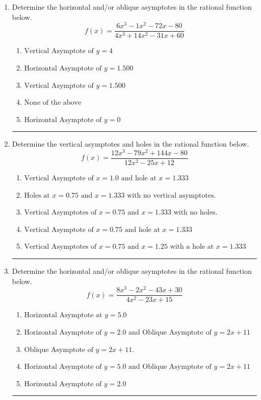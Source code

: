 \documentclass[14pt]{extbook}
\newcommand{\litem}[1]{\item#1\hspace*{-1cm}\rule{\textwidth}{0.4pt}}
\begin{document}
\begin{enumerate}
{\begin{enumerate}[label=\Alph*.]
\end{enumerate} }
\litem{
Determine the horizontal and/or oblique asymptotes in the rational function below.\[ f(x) = \frac{6x^{3} -1 x^{2} -72 x -80}{4x^{3} +14 x^{2} -31 x + 60} \]\begin{enumerate}[label=\Alph*.]
\item \( \text{Vertical Asymptote of } y = 4  \)
\item \( \text{Horizontal Asymptote of } y = 1.500  \)
\item \( \text{Vertical Asymptote of } y = 1.500  \)
\item \( \text{None of the above} \)
\item \( \text{Horizontal Asymptote of } y = 0  \)

\end{enumerate} }
\litem{
Determine the vertical asymptotes and holes in the rational function below.\[ f(x) = \frac{12x^{3} -79 x^{2} +144 x -80}{12x^{2} -25 x + 12} \]\begin{enumerate}[label=\Alph*.]
\item \( \text{Vertical Asymptote of } x = 1.0 \text{ and hole at } x = 1.333 \)
\item \( \text{Holes at } x = 0.75 \text{ and } x = 1.333 \text{ with no vertical asymptotes.} \)
\item \( \text{Vertical Asymptotes of } x = 0.75 \text{ and } x = 1.333 \text{ with no holes.} \)
\item \( \text{Vertical Asymptote of } x = 0.75 \text{ and hole at } x = 1.333 \)
\item \( \text{Vertical Asymptotes of } x = 0.75 \text{ and } x = 1.25 \text{ with a hole at } x = 1.333 \)

\end{enumerate} }
\litem{
Determine the horizontal and/or oblique asymptotes in the rational function below.\[ f(x) = \frac{8x^{3} -2 x^{2} -43 x + 30}{4x^{2} -23 x + 15} \]\begin{enumerate}[label=\Alph*.]
\item \( \text{Horizontal Asymptote at } y = 5.0 \)
\item \( \text{Horizontal Asymptote of } y = 2.0 \text{ and Oblique Asymptote of } y = 2x + 11 \)
\item \( \text{Oblique Asymptote of } y = 2x + 11. \)
\item \( \text{Horizontal Asymptote of } y = 5.0 \text{ and Oblique Asymptote of } y = 2x + 11 \)
\item \( \text{Horizontal Asymptote of } y = 2.0  \)


\end{enumerate}}
\end{enumerate}
\end{document}
